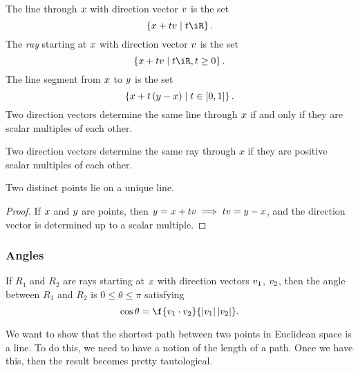 The line through $x$ with direction vector $v$ is the set
\begin{equation*}
	\left\{ \xx+t\vv \mid t\iR \right\}.
\end{equation*}
The \emph{ray} starting at $x$ with direction vector $v$ is the set
\begin{equation*}
	\left\{ \xx+t\vv \mid t\iR, t\geq 0 \right\}.
\end{equation*}
The line segment from $x$ to $y$ is the set
\begin{equation*}
	\left\{ x + t\left( y-x \right) \mid t\in[0,1] \right\}.
\end{equation*}
Two direction vectors determine the same line through $x$ if and only if they are scalar multiples of each other.

Two direction vectors determine the same ray through $x$ if they are positive scalar multiples of each other.

\vspace{3pt}

\begin{proposition}
	Two distinct points lie on a unique line. %
\end{proposition}

\begin{proof}
	If $x$ and $y$ are points, then $y = x + tv \implies tv = y - x$, and the direction vector is determined up to a scalar multiple. %
\end{proof}


\subsubsection*{Angles} %
\label{ssub:angles}

If $R_1$ and $R_2$ are rays starting at $x$ with direction vectors $v_1$, $v_2$, then the angle between $R_1$ and $R_2$ is $0\leq \theta \leq \pi$ satisfying
\begin{equation*}
	\cos \theta = \f{\vv_1 \cdot \vv_2}{\left\vert \vv_1 \right\vert \left\vert \vv_2 \right\vert}.
\end{equation*}


	\pagebreak

We want to show that the shortest path between two points in Euclidean space is a line. To do this, we need to have a notion of the length of a path. Once we have this, then the result becomes pretty tautological.

